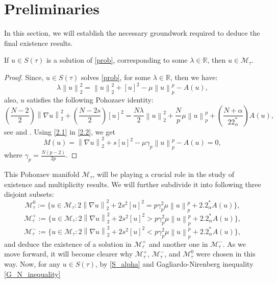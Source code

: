 \documentclass[11pt]{article}
\numberwithin{equation}{section}
\numberwithin{mytheorem}{section}
\begin{document}
		\section{Preliminaries}
		\noindent In this section, we will establish the necessary groundwork required to deduce the final existence results.
		\begin{lemma}\label{Lemma 2.1}
			If $u\in S(\tau)$ is a solution of \eqref{prob}, corresponding to some $\lambda \in \mathbb{R}$, then 
			$u \in \mathcal{M}_{\tau}.$
		\end{lemma}
		\begin{proof}
			Since, $u\in S(\tau)$ solves \eqref{prob}, for some $\lambda\in \mathbb{R}$, then we have:
			\begin{equation}\label{2.1}
				\lambda \left\| u \right\|_2^2 = \left\| u \right\|_2^2+[u]^2-\mu\left\| u \right\|_p^p-A(u),
			\end{equation}
			also, 
			$u$ satisfies the following Pohozaev identity:
			\begin{equation}\label{2.2}
				\left(\frac{N-2}{2}\right)\left\| \nabla u \right\|_2^2 +\left(\frac{N-2s}{2}\right) [u]^2= \frac{N\lambda}{2}\left\| u \right\|_2^2+\frac{N}{p}\mu\left\| u \right\|_p^p+\left(\frac{N+\alpha}{22^*_{\alpha}}\right)A(u),
			\end{equation}
			see \cite[Theorem~A1]{Giacomoni2025Normalized} and \cite[Theorem~2.5]{Anthal2025Pohozaev}.
			Using \eqref{2.1} in \eqref{2.2}, we get
			$$M(u)= \left\| \nabla u \right\|_2^2+s[u]^2-\mu\gamma_p\left\| u \right\|_p^p-A(u)=0,$$
			where $\gamma_p= \frac{N(p-2)}{2p}$.
		\end{proof}
		\noindent This Pohozaev manifold $\mathcal{M}_{\tau}$, will be playing a crucial role in the study of existence and multiplicity results. We will further subdivide it into following three disjoint subsets:
		$$\mathcal{M}_{\tau}^0:= \{u\in \mathcal{M}_{\tau} : 2 \left\| \nabla u \right\|_2^2+2s^2[u]^2=p\gamma_p^2\mu\left\| u \right\|_p^p+2.2^*_{\alpha}A(u)\},$$
		$$\mathcal{M}_{\tau}^+:= \{u\in \mathcal{M}_{\tau} : 2 \left\| \nabla u \right\|_2^2+2s^2[u]^2>p\gamma_p^2\mu\left\| u \right\|_p^p+2.2^*_{\alpha}A(u)\},$$			$$\mathcal{M}_{\tau}^-:= \{u\in \mathcal{M}_{\tau} : 2 \left\| \nabla u \right\|_2^2+2s^2[u]^2<p\gamma_p^2\mu\left\| u \right\|_p^p+2.2^*_{\alpha}A(u)\},$$
		and deduce the existence of a solution in $\mathcal{M}_{\tau}^+$ and another one in $\mathcal{M}_{\tau}^-$. As we move forward, it will become clearer why $\mathcal{M}_{\tau}^+$, $\mathcal{M}_{\tau}^-$, and $\mathcal{M}_{\tau}^0$ were chosen in this way. Now, for any $u\in S(\tau)$, by \eqref{S_alpha} and Gagliardo-Nirenberg inequality \eqref{G_N_inequality}
\end{document}
